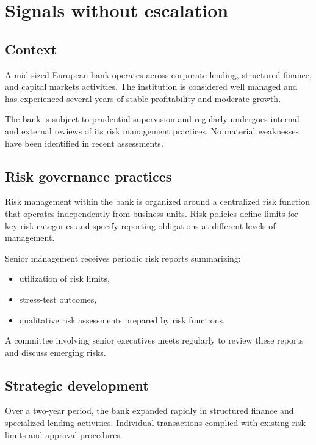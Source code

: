 \documentclass[11pt]{article}
\begin{document}
\pagebreak


\section{Signals without escalation}

\subsection*{Context}

A mid-sized European bank operates across corporate lending, structured finance,
and capital markets activities. The institution is considered well managed and
has experienced several years of stable profitability and moderate growth.

The bank is subject to prudential supervision and regularly undergoes internal
and external reviews of its risk management practices. No material weaknesses
have been identified in recent assessments.

\subsection*{Risk governance practices}

Risk management within the bank is organized around a centralized risk function
that operates independently from business units. Risk policies define limits
for key risk categories and specify reporting obligations at different levels of
management.

Senior management receives periodic risk reports summarizing:
\begin{itemize}
    \item[$\bullet$] utilization of risk limits,
    \item[$\bullet$] stress-test outcomes,
    \item[$\bullet$] qualitative risk assessments prepared by risk functions.
\end{itemize}

A committee involving senior executives meets regularly to review these reports
and discuss emerging risks.

\subsection*{Strategic development}

Over a two-year period, the bank expanded rapidly in structured finance and
specialized lending activities. Individual transactions complied with existing
risk limits and approval procedures.
\end{document}
